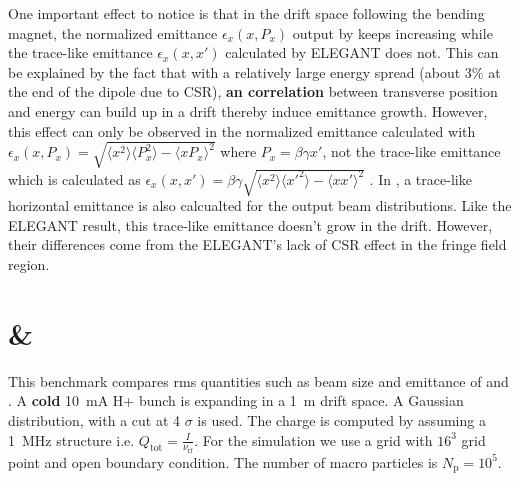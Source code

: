 One important effect to notice is that in the drift space following the bending magnet, the normalized emittance $\epsilon_x(x, P_x)$ output by \opal keeps increasing while the trace-like emittance $\epsilon_x(x, x')$ calculated by ELEGANT does not. This can be explained by the fact that with a relatively large energy spread (about $3\%$ at the end of the dipole due to CSR), {\bf an correlation} between transverse position and energy can build up in a drift thereby induce emittance growth. However, this effect can only be observed in the normalized emittance calculated with $\epsilon_x(x, P_x) = \sqrt{\langle x^2 \rangle \langle P_x^2\rangle - \langle xP_x \rangle^2}$ where $P_x = \beta\gamma x'$, not the trace-like emittance which is calculated as $\epsilon_x(x, x') = \beta\gamma\sqrt{\langle x^2 \rangle \langle x'^2 \rangle - \langle xx' \rangle^2}$ \cite{prstab2003}. In , a trace-like horizontal emittance is also calcualted for the \opal output beam distributions. Like the ELEGANT result, this trace-like emittance doesn't grow in the drift. However, their differences come from the ELEGANT's lack of CSR effect in the fringe field region.

\section{\opal \& \impactt}
This benchmark compares rms quantities such as beam size and emittance of \opal and \impactt \cite{qiang2005, qiang2006-1, qiang2006-2}. A {\bf cold} \SI{10}{\milli\ampere} H+ bunch is expanding in a \SI{1}{\meter} drift space. A Gaussian distribution, with a cut at 4 $\sigma$ is used. The charge is computed by assuming a \SI{1}{\mega\hertz} structure i.e. $Q_{\text{tot}}=\frac{I}{\nu_{\text{rf}}}$. For the simulation we use a grid with $16^{3}$ grid point and open boundary condition. The number of macro
particles is $N_{\text{p}} = 10^{5}$.


